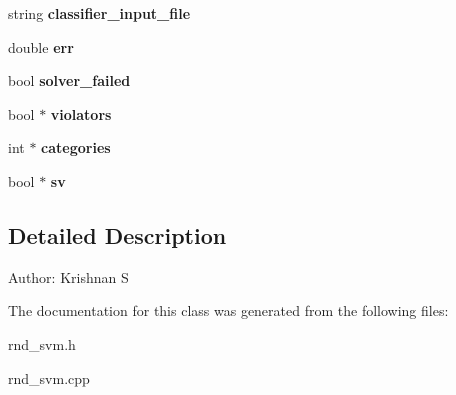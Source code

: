 \begin{CompactItemize}
\item 
string \textbf{classifier\_\-input\_\-file}\label{classRND__SVM_332574beed30f0cb74e13b512352d454}

\item 
double \textbf{err}\label{classRND__SVM_f56bacf4c57286ee44709ddb445a1555}

\item 
bool \textbf{solver\_\-failed}\label{classRND__SVM_2331c1cafe91b3deaf8128948cd77c41}

\item 
bool $\ast$ \textbf{violators}\label{classRND__SVM_de6040d5a57f53cdcd58507ad40b087c}

\item 
int $\ast$ \textbf{categories}\label{classRND__SVM_338834fe952951b447c48565677619e5}

\item 
bool $\ast$ \textbf{sv}\label{classRND__SVM_c8e3c813800c9a0339d91ab9ae149838}

\end{CompactItemize}


\subsection{Detailed Description}
\begin{Desc}
\item[Author:]Krishnan S \end{Desc}




The documentation for this class was generated from the following files:\begin{CompactItemize}
\item 
rnd\_\-svm.h\item 
rnd\_\-svm.cpp\end{CompactItemize}
